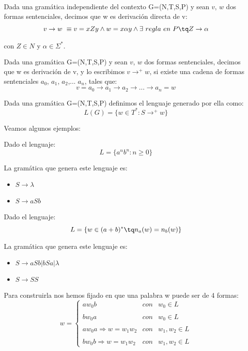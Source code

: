 \documentclass{apuntes}
\begin{document}
\begin{defn}
Dada una gramática independiente del contexto G=(N,T,S,P) y sean $v$, $w$ dos formas sentenciales, decimos que w es derivación directa de v:
\[v \rightarrow w\ \equiv v=xZy \wedge w=x\alpha y \wedge \exists \ regla \ en \ P \tq Z \rightarrow \alpha\]
\end{defn}

\noindent con $Z \in N$ y $\alpha \in \Sigma^{*}$.

\begin{defn}[Derivación]
Dada una gramática G=(N,T,S,P) y sean $v$, $w$ dos formas sentenciales, decimos que w es derivación de v, y lo escribimos $v \rightarrow^{+} w$, si existe una cadena de formas sentenciales $a_{0}$, $a_{1}$, $a_{2}$,... $a_{n}$, tales que:
\[v = a_0 \rightarrow a_1 \rightarrow a_2 \rightarrow ... \rightarrow a_n = w\]
\end{defn}

\newpage
\begin{defn}
Dada una gramática G=(N,T,S,P) definimos el lenguaje generado por ella como:
\[L(G) = \lbrace w \in T^*: S \rightarrow^{+} w \rbrace\]
\end{defn}


Veamos algunos ejemplos:

\begin{example}
Dado el lenguaje:
\[L = \lbrace a^n b^n : n\geq 0 \rbrace\]

La gramática que genera este lenguaje es:
\begin{itemize}
\item $S \rightarrow \lambda$
\item $S \rightarrow aSb$
\end{itemize}
\end{example}

\begin{example}
Dado el lenguaje:
\[L = \lbrace w \in (a+b)^* \tq n_a(w)=n_b(w)\rbrace\]

La gramática que genera este lenguaje es:
\begin{itemize}
\item $S \rightarrow aSb | bSa | \lambda$
\item $S \rightarrow SS$
\end{itemize}

Para construirla nos hemos fijado en que una palabra w puede ser de 4 formas:
\[w = \left\{ \begin{array}{lcc}
             aw_0b &   con  & w_0 \in L \\
             \\ bw_0a &  con & w_0 \in L \\
             \\ aw_0a  \Rightarrow  w = w_1w_2  & con  & w_1,w_2 \in L\\
             \\ bw_0b  \Rightarrow  w = w_1w_2  &  con &  w_1,w_2 \in L
             \end{array}
   \right.\]
\end{example}
\end{document}
